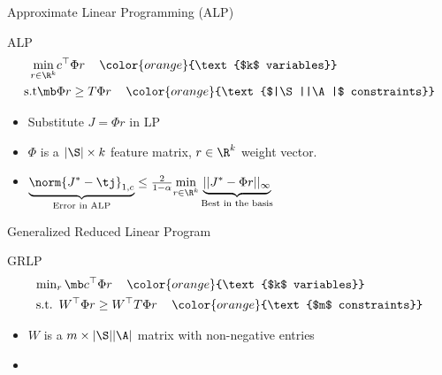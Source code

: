 \documentclass[handout,10pt]{beamer}
\begin{document}
\begin{frame}[fragile]{Approximate Linear Programming (ALP)}
\begin{block}{ALP \cite{schweitzer1985generalized,de2003linear}}
\begin{align*}
\min_{r\in \R^k} &c^\top \Phi r\,\quad{\color{orange}{\text{$k$ variables}}}\\
\text{s.t}\mb &\Phi r\geq T \Phi r\,\quad{\color{orange}{\text{$|\S||\A|$ constraints}}}
\end{align*}
\end{block}

\begin{itemize}
\item Substitute $J=\Phi r$ in LP
\item $\Phi$ is a $|\S|\times k$ feature matrix, $r\in \R^k$ weight vector.
\item $\underbrace{\norm{J^*-\tj}_{1,c}}_{\text{Error in ALP}}\leq \frac{2}{1-\alpha}\underset{r\in \R^k}{\min}\underbrace{||J^*-\Phi r||_{\infty}}_{\text{Best in the basis}}$
\end{itemize}
\begin{center}{\color{orange}{Need to reduce constraints}}\end{center}
\end{frame}

\begin{frame}[fragile]{Generalized Reduced Linear Program}
\begin{block}{GRLP}
\begin{align*}
&{\min}_r \,\mb c^\top \Phi r\,\quad{\color{orange}{\text{$k$ variables}}}\\
&\text{s.t.} \,\,\, W^\top  \Phi r\geq W^\top T \Phi r\,\quad{\color{orange}{\text{$m$ constraints}}}
\end{align*}
\end{block}

\begin{itemize}
\item $W$ is a $m\times |\S||\A|$ matrix with non-negative entries
\item {}
\end{itemize}
\end{frame}
\end{document}
